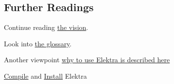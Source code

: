 \subsection*{Further Readings}


\begin{DoxyItemize}
\item Continue reading \hyperlink{doc_VISION_md}{the vision}.
\item Look into \hyperlink{doc_help_elektra-glossary_md}{the glossary}.
\item Another viewpoint \hyperlink{doc_help_elektra-introduction_md}{why to use Elektra is described here}
\item \hyperlink{doc_COMPILE_md}{Compile} and \hyperlink{doc_INSTALL_md}{Install} Elektra 
\end{DoxyItemize}